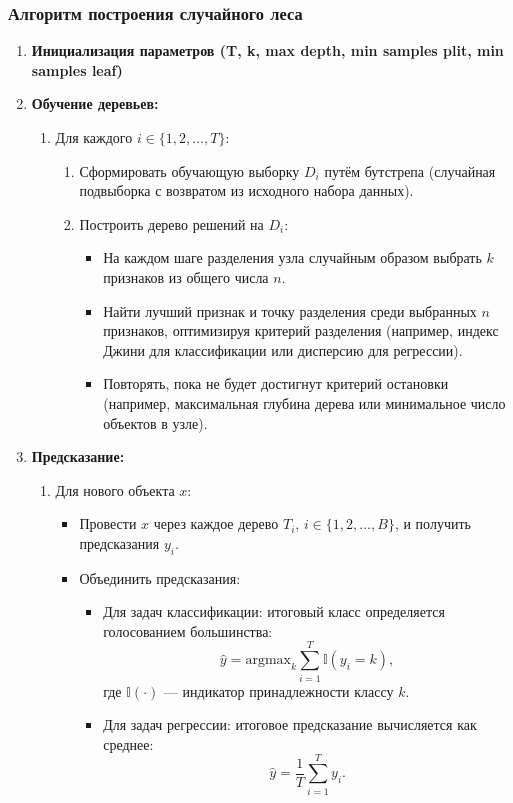 \subsubsection*{Алгоритм построения случайного леса}

\begin{enumerate}
    \item \textbf{Инициализация параметров (T, k, max depth, min samples plit, min samples leaf)}

    \item \textbf{Обучение деревьев:}
    \begin{enumerate}
        \item Для каждого \(i \in \{1, 2, \dots, T\}\):
        \begin{enumerate}
            \item Сформировать обучающую выборку \(D_i\) путём бутстрепа (случайная подвыборка с возвратом из исходного набора данных).
            \item Построить дерево решений на \(D_i\):
            \begin{itemize}
                \item На каждом шаге разделения узла случайным образом выбрать \(k\) признаков из общего числа \(n\).
                \item Найти лучший признак и точку разделения среди выбранных \(n\) признаков, оптимизируя критерий разделения (например, индекс Джини для классификации или дисперсию для регрессии).
                \item Повторять, пока не будет достигнут критерий остановки (например, максимальная глубина дерева или минимальное число объектов в узле).
            \end{itemize}
        \end{enumerate}
    \end{enumerate}

    \item \textbf{Предсказание:}
    \begin{enumerate}
        \item Для нового объекта \(x\):
        \begin{itemize}
            \item Провести \(x\) через каждое дерево \(T_i\), \(i \in \{1, 2, \dots, B\}\), и получить предсказания \(y_i\).
            \item Объединить предсказания:
            \begin{itemize}
                \item Для задач классификации: итоговый класс определяется голосованием большинства:
                \[
                \hat{y} = \text{argmax}_k \sum_{i=1}^T \mathbb{I}(y_i = k),
                \]
                где \(\mathbb{I}(\cdot)\) — индикатор принадлежности классу \(k\).
                \item Для задач регрессии: итоговое предсказание вычисляется как среднее:
                \[
                \hat{y} = \frac{1}{T} \sum_{i=1}^T y_i.
                \]
            \end{itemize}
        \end{itemize}
    \end{enumerate}
\end{enumerate}


